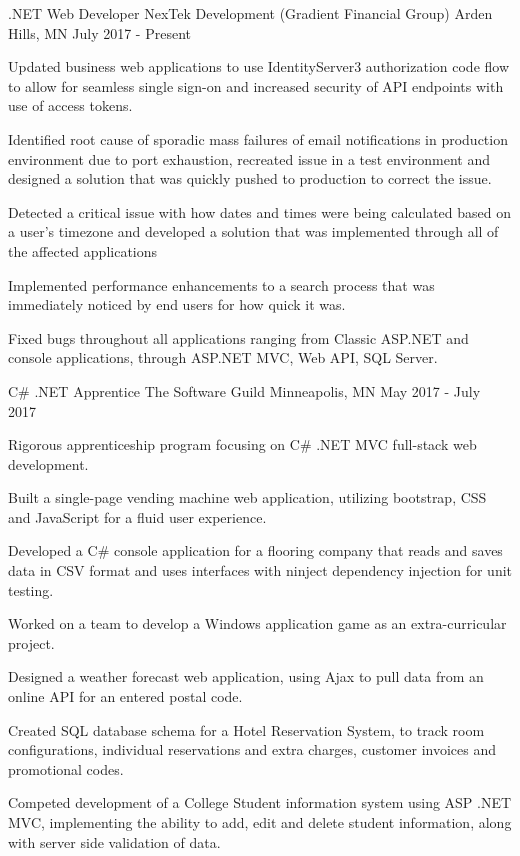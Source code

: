 \begin{cventries}
  \cventry
    {.NET Web Developer}
    {NexTek Development (Gradient Financial Group)}
    {Arden Hills, MN}
    {July 2017 - Present}
    {
      \begin{cvitems}
       \item {Updated business web applications to use IdentityServer3 authorization code flow to allow for seamless single sign-on and increased security of API endpoints with use of access tokens.}
       \item {Identified root cause of sporadic mass failures of email notifications in production environment due to port exhaustion, recreated issue in a test environment and designed a solution that was quickly pushed to production to correct the issue.}
       \item {Detected a critical issue with how dates and times were being calculated based on a user's timezone and developed a solution that was implemented through all of the affected applications}
       \item {Implemented performance enhancements to a search process that was immediately noticed by end users for how quick it was.}
       \item {Fixed bugs throughout all applications ranging from Classic ASP.NET and console applications, through ASP.NET MVC, Web API, SQL Server.}
      \end{cvitems}
    }{}{}

  \cventry
    {C\# .NET Apprentice}
    {The Software Guild}
    {Minneapolis, MN}
    {May 2017 - July 2017}
    {
      \begin{cvitems}
       \item {Rigorous apprenticeship program focusing on C\# .NET MVC full-stack web development.}
       \item {Built a single-page vending machine web application, utilizing bootstrap, CSS and JavaScript for a fluid user experience.}
       \item {Developed a C\# console application for a flooring company that reads and saves data in CSV format and uses interfaces with ninject dependency injection for unit testing.}
       \item {Worked on a team to develop a Windows application game as an extra-curricular project.}
       \item {Designed a weather forecast web application, using Ajax to pull data from an online API for an entered postal code.}
	\item {Created SQL database schema for a Hotel Reservation System, to track room configurations, individual reservations and extra charges, customer invoices and promotional codes.}
	\item {Competed development of a College Student information system using ASP .NET MVC, implementing the ability to add, edit and delete student information, along with server side validation of data.}
      \end{cvitems}
    }{}{}



\end{cventries}
